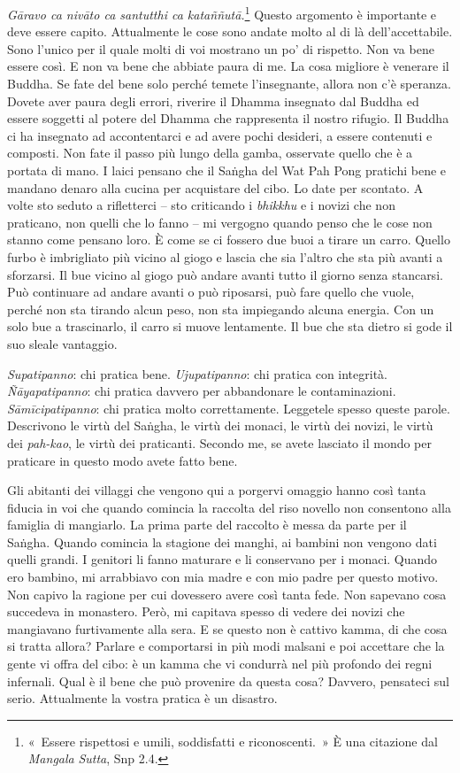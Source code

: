 \emph{Gāravo ca nivāto ca santutthi ca kataññutā.}\footnote{«~Essere
  rispettosi e umili, soddisfatti e riconoscenti.~» È una citazione dal
  \emph{Mangala} \emph{Sutta}, Snp 2.4.} Questo argomento è importante e
deve essere capito. Attualmente le cose sono andate molto al di là
dell'accettabile. Sono l'unico per il quale molti di voi mostrano un po'
di rispetto. Non va bene essere così. E non va bene che abbiate paura di
me. La cosa migliore è venerare il Buddha. Se fate del bene solo perché
temete l'insegnante, allora non c'è speranza. Dovete aver paura degli
errori, riverire il Dhamma insegnato dal Buddha ed essere soggetti al
potere del Dhamma che rappresenta il nostro rifugio. Il Buddha ci ha
insegnato ad accontentarci e ad avere pochi desideri, a essere contenuti
e composti. Non fate il passo più lungo della gamba, osservate quello
che è a portata di mano. I laici pensano che il Saṅgha del Wat Pah Pong
pratichi bene e mandano denaro alla cucina per acquistare del cibo. Lo
date per scontato. A volte sto seduto a rifletterci -- sto criticando i
\emph{bhikkhu} e i novizi che non praticano, non quelli che lo fanno --
mi vergogno quando penso che le cose non stanno come pensano loro. È
come se ci fossero due buoi a tirare un carro. Quello furbo è
imbrigliato più vicino al giogo e lascia che sia l'altro che sta più
avanti a sforzarsi. Il bue vicino al giogo può andare avanti tutto il
giorno senza stancarsi. Può continuare ad andare avanti o può riposarsi,
può fare quello che vuole, perché non sta tirando alcun peso, non sta
impiegando alcuna energia. Con un solo bue a trascinarlo, il carro si
muove lentamente. Il bue che sta dietro si gode il suo sleale vantaggio.

\emph{Supatipanno}: chi pratica bene. \emph{Ujupatipanno}: chi pratica
con integrità. \emph{Ñāyapatipanno}: chi pratica davvero per abbandonare
le contaminazioni. \emph{Sāmīcipatipanno}: chi pratica molto
correttamente. Leggetele spesso queste parole. Descrivono le virtù del
Saṅgha, le virtù dei monaci, le virtù dei novizi, le virtù dei
\emph{pah-kao}, le virtù dei praticanti. Secondo me, se avete lasciato
il mondo per praticare in questo modo avete fatto bene.

Gli abitanti dei villaggi che vengono qui a porgervi omaggio hanno così
tanta fiducia in voi che quando comincia la raccolta del riso novello
non consentono alla famiglia di mangiarlo. La prima parte del raccolto è
messa da parte per il Saṅgha. Quando comincia la stagione dei manghi, ai
bambini non vengono dati quelli grandi. I genitori li fanno maturare e
li conservano per i monaci. Quando ero bambino, mi arrabbiavo con mia
madre e con mio padre per questo motivo. Non capivo la ragione per cui
dovessero avere così tanta fede. Non sapevano cosa succedeva in
monastero. Però, mi capitava spesso di vedere dei novizi che mangiavano
furtivamente alla sera. E se questo non è cattivo kamma, di che
cosa si tratta allora? Parlare e comportarsi in più modi malsani e poi
accettare che la gente vi offra del cibo: è un kamma che vi
condurrà nel più profondo dei regni infernali. Qual è il bene che può
provenire da questa cosa? Davvero, pensateci sul serio. Attualmente la
vostra pratica è un disastro.

